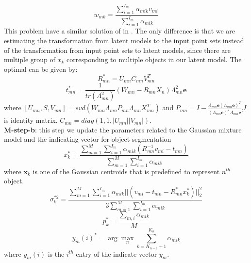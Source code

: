 \begin{equation}
w_{mk}=\frac{\sum_{i=1}^{I_m}\alpha_{mik}v_{mi}}{\sum_{i=1}^{I_m}\alpha_{mik}}
\end{equation}
This problem have a similar solution of in \cite{Evangelidis2014}. The only difference is that we are estimating the transformation from latent models to the input point sets instead of the transformation from input point sets to latent models, since there are multiple group of $x_k$ corresponding to multiple objects in our latent model. The optimal can be given by:\\
\begin{equation}
\label{equ:updateR}
R_{mn}^*=U_{mn}C_{mn}V_{mn}^T
\end{equation}
\begin{equation}
\label{equ:updatet}
t_{mn}^*=\frac{1}{tr(\Lambda_{mn}^2)}(W_{mn}-R_{mn}X_n)\Lambda_{mn}^2\mathbf{e}
\end{equation}
where $[U_{mn},S,V_{mn}]=svd( W_{mn}\Lambda_{mn}P_{mn}\Lambda_{mn}X_{mn}^T )$ and $P_{mn}=I-\frac{\Lambda_{mn}\mathbf{e}(\Lambda_{mn}\mathbf{e})^T}{(\Lambda_{mn}\mathbf{e})^T\Lambda_{mn}\mathbf{e}}$,$I$ is identity matrix. $C_{mn}=diag(1,1,|U_{mn}||V_{mn}|)$.\\
\textbf{M-step-b}: this step we update the parameters related to the Gaussian mixture model and the indicating vector for object segmentation 
\begin{equation}
\label{equ:updatexk}
x_k^*=\frac{\sum_{m=1}^M\sum_{i=1}^{I_m}\alpha_{mik}(R_{mn}^{-1}v_{mi}-t_{mn})}{\sum_{m=1}^M\sum_{i=1}^{I_m}\alpha_{mik}}
\end{equation}
where $\pmb x_k$ is one of the Gaussian centroids that is predefined to represent $n^{th}$ object. 
\begin{equation}
\label{equ:updatesigma}
\sigma_k^{*2}=\frac{\sum_{m=1}^M\sum_{i=1}^{I_m}\alpha_{mik}||(v_{mi}-t_{mn}-R_{mn}^*x_k^*)||_2^2}{3\sum_{m=1}^M\sum_{i=1}^{I_m}\alpha_{mik}}
\end{equation}
\begin{equation}
\label{equ:updatepk}
p_k^*=\frac{\sum_{m,i}\alpha_{mik}}{M}
\end{equation}
\begin{equation}
\label{equ:updatey}
y_{m}(i)^*=\arg \max_n \sum_{k=K_{n-1}+1}^{K_n} \alpha_{mik} 
\end{equation}
where $y_{m}(i)$ is the $i^{th}$ entry of the indicate vector $y_m$.
